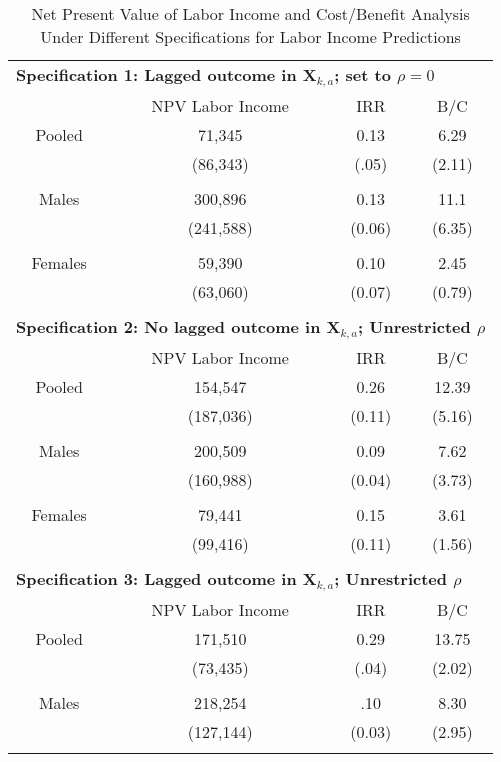 \begin{table}[H] 
\begin{threeparttable}
\caption{Net Present Value of Labor Income and Cost/Benefit Analysis Under Different Specifications for Labor Income Predictions}
\label{table:predsens}
\centering 
\footnotesize
\begin{tabular}{cccc} \toprule
\multicolumn{4}{l}{ \textbf{Specification 1:  Lagged outcome in $\bm{X}_{k,a}$; set to $\rho = 0$}} \\
& NPV Labor Income & IRR & B/C \\
Pooled  & 71,345 & 0.13  & 6.29 \\ 
             & (86,343) & (.05) & (2.11) \\ \\  
Males & 300,896 & 0.13  & 11.1 \\ 
               & (241,588) & (0.06)  & (6.35) \\ \\ 
Females & 59,390 & 0.10  & 2.45 \\  
          & (63,060) & (0.07) & (0.79) \\ \midrule \\ 
\multicolumn{4}{l}{\textbf{Specification 2:  No lagged outcome in $\bm{X}_{k,a}$; Unrestricted $\rho$}} \\
& NPV Labor Income & IRR & B/C \\
Pooled  & 154,547 & 0.26  & 12.39 \\ 
             & (187,036) & (0.11)  & (5.16) \\ \\
Males & 200,509 & 0.09 & 7.62 \\ 
               & (160,988) & (0.04) & (3.73) \\ \\
Females & 79,441 & 0.15 & 3.61 \\  
          & (99,416) & (0.11) & (1.56) \\ \midrule \\ 
\multicolumn{4}{l}{\textbf{Specification 3:  Lagged outcome in $\bm{X}_{k,a}$; Unrestricted $\rho$}} \\
& NPV Labor Income & IRR & B/C \\
Pooled  & 171,510 & 0.29 & 13.75 \\ 
             & (73,435) & (.04) & (2.02) \\ \\ 
Males & 218,254 & .10  & 8.30 \\ 
               & (127,144) & (0.03)  & (2.95) \\ \\  

\end{tabular}
\end{threeparttable}
\end{table}
